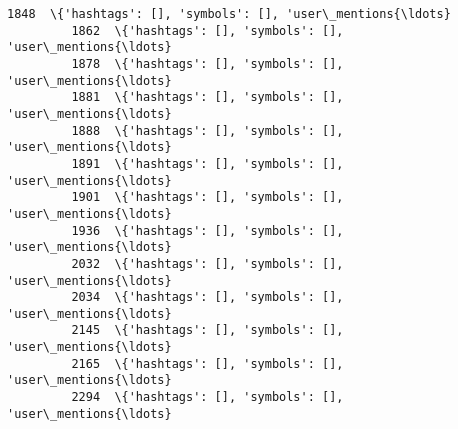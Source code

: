 \documentclass[11pt]{article}
\begin{document}
\begin{Verbatim}[commandchars=\\\{\}]
         1848  \{'hashtags': [], 'symbols': [], 'user\_mentions{\ldots}   
         1862  \{'hashtags': [], 'symbols': [], 'user\_mentions{\ldots}   
         1878  \{'hashtags': [], 'symbols': [], 'user\_mentions{\ldots}   
         1881  \{'hashtags': [], 'symbols': [], 'user\_mentions{\ldots}   
         1888  \{'hashtags': [], 'symbols': [], 'user\_mentions{\ldots}   
         1891  \{'hashtags': [], 'symbols': [], 'user\_mentions{\ldots}   
         1901  \{'hashtags': [], 'symbols': [], 'user\_mentions{\ldots}   
         1936  \{'hashtags': [], 'symbols': [], 'user\_mentions{\ldots}   
         2032  \{'hashtags': [], 'symbols': [], 'user\_mentions{\ldots}   
         2034  \{'hashtags': [], 'symbols': [], 'user\_mentions{\ldots}   
         2145  \{'hashtags': [], 'symbols': [], 'user\_mentions{\ldots}   
         2165  \{'hashtags': [], 'symbols': [], 'user\_mentions{\ldots}   
         2294  \{'hashtags': [], 'symbols': [], 'user\_mentions{\ldots}   
         

\end{Verbatim}
\end{document}
